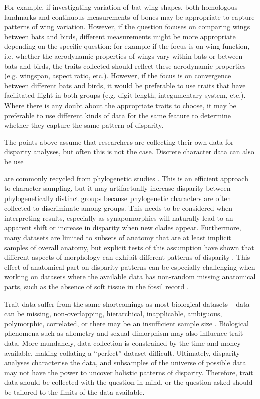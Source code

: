 \documentclass[12pt,letterpaper]{article}
\begin{document}
For example, if investigating variation of bat wing shapes, both homologous landmarks and continuous measurements of bones may be appropriate to capture patterns of wing variation.
However, if the question focuses on comparing wings between bats and birds, different measurements might be more appropriate depending on the specific question: for example if the focus is on wing function, i.e. whether the aerodynamic properties of wings vary within bats or between bats and birds, the traits collected should reflect these aerodynamic properties (e.g. wingspan, aspect ratio, etc.).
However, if the focus is on convergence between different bats and birds, it would be preferable to use traits that have facilitated flight in both groups (e.g. digit length, integumentary system, etc.).
Where there is any doubt about the appropriate traits to choose, it may be preferable to use different kinds of data for the same feature to determine whether they capture the same pattern of disparity.

The points above assume that researchers are collecting their own data for disparity analyses, but often this is not the case.
Discrete character data can also be use


are commonly recycled from phylogenetic studies \citep[][e.g]{Brusatte2008-fx,Close2015-qi,Wright2017-jo}.
This is an efficient approach to character sampling, but it may artifactually increase disparity between phylogenetically distinct groups because phylogenetic characters are often collected to discriminate among groups.
This needs to be considered when interpreting results, especially as synapomorphies will naturally lead to an apparent shift or increase in disparity when new clades appear.
Furthermore, many datasets are limited to subsets of anatomy that are at least implicit samples of overall anatomy, but explicit tests of this assumption have shown that different aspects of morphology can exhibit different patterns of disparity \citep{Hopkins2017-cf}.
This effect of anatomical part on disparity patterns can be especially challenging when working on datasets where the available data has non-random missing anatomical parts, such as the absence of soft tissue in the fossil record \citep{Deline2018-le}.

Trait data suffer from the same shortcomings as most biological datasets -- data can be missing, non-overlapping, hierarchical, inapplicable, ambiguous, polymorphic, correlated, or there may be an insufficient sample size \citep{Brazeau2017-kg, Palci2018-ni}.
Biological phenomena such as allometry and sexual dimorphism may also influence trait data.
More mundanely, data collection is constrained by the time and money available, making collating a ``perfect'' dataset difficult.
Ultimately, disparity analyses characterise the data, and subsamples of the universe of possible data may not have the power to uncover holistic patterns of disparity.
Therefore, trait data should be collected with the question in mind, or the question asked should be tailored to the limits of the data available.
\end{document}
